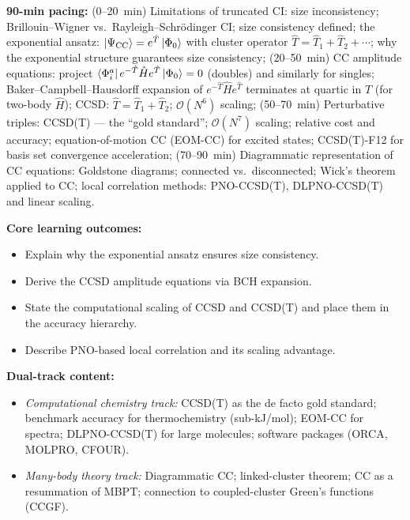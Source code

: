 \documentclass[11pt,a4paper]{article}
\begin{document}
\begin{tcolorbox}[modulebox, title={Module~II.1 --- Lecture L04: Coupled-Cluster Methods}]
\textbf{90-min pacing:} (0--20~min) Limitations of truncated CI: size inconsistency;
Brillouin--Wigner vs.\ Rayleigh--Schr\"odinger CI; size consistency defined;
the exponential ansatz: $\ket{\Psi_{\rm CC}}=e^{\hat{T}}\ket{\Phi_0}$ with cluster
operator $\hat{T}=\hat{T}_1+\hat{T}_2+\cdots$;
why the exponential structure guarantees size consistency;
(20--50~min) CC amplitude equations: project $\bra{\Phi_i^a}e^{-\hat{T}}\hat{H}e^{\hat{T}}\ket{\Phi_0}=0$
(doubles) and similarly for singles; Baker--Campbell--Hausdorff expansion of $e^{-\hat{T}}\hat{H}e^{\hat{T}}$
terminates at quartic in $\hat{T}$ (for two-body $\hat{H}$);
CCSD: $\hat{T}=\hat{T}_1+\hat{T}_2$; $\mathcal{O}(N^6)$ scaling;
(50--70~min) Perturbative triples: CCSD(T) --- the ``gold standard'';
$\mathcal{O}(N^7)$ scaling; relative cost and accuracy;
equation-of-motion CC (EOM-CC) for excited states; CCSD(T)-F12 for basis set
convergence acceleration;
(70--90~min) Diagrammatic representation of CC equations: Goldstone diagrams;
connected vs.\ disconnected; Wick's theorem applied to CC;
local correlation methods: PNO-CCSD(T), DLPNO-CCSD(T) and linear scaling.

\medskip\textbf{Core learning outcomes:}
\begin{itemize}[leftmargin=1.4em,topsep=2pt,itemsep=1pt]
  \item Explain why the exponential ansatz ensures size consistency.
  \item Derive the CCSD amplitude equations via BCH expansion.
  \item State the computational scaling of CCSD and CCSD(T) and place them in the accuracy hierarchy.
  \item Describe PNO-based local correlation and its scaling advantage.
\end{itemize}

\medskip\textbf{Dual-track content:}
\begin{itemize}[leftmargin=1.4em,topsep=2pt,itemsep=1pt]
  \item \textit{Computational chemistry track:} CCSD(T) as the de facto gold standard;
    benchmark accuracy for thermochemistry (sub-kJ/mol); EOM-CC for spectra;
    DLPNO-CCSD(T) for large molecules; software packages (ORCA, MOLPRO, CFOUR).
  \item \textit{Many-body theory track:} Diagrammatic CC; linked-cluster theorem;
    CC as a resummation of MBPT; connection to coupled-cluster Green's functions (CCGF).
\end{itemize}


\end{tcolorbox}
\end{document}

